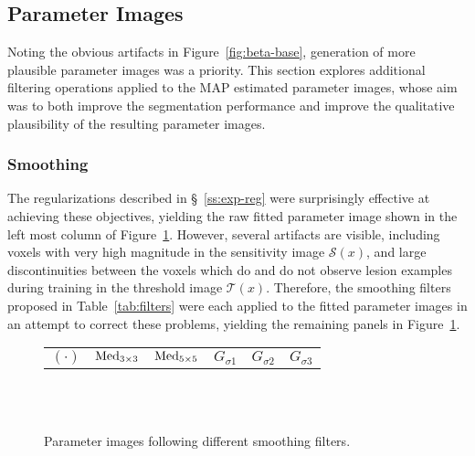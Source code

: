 \subsection{Parameter Images}\label{ss:exp-beta}
Noting the obvious artifacts in Figure~\ref{fig:beta-base},
generation of more plausible parameter images was a priority.
This section explores additional filtering operations applied to the
MAP estimated parameter images, whose aim was to both
improve the segmentation performance
and improve the qualitative plausibility of the resulting parameter images.
\subsubsection{Smoothing}\label{sss:exp-beta-smooth}
The regularizations described in \S~\ref{ss:exp-reg} were surprisingly effective
at achieving these objectives, yielding the raw fitted parameter image
shown in the left most column of Figure~\ref{fig:beta-smooth}.
However, several artifacts are visible, including
voxels with very high magnitude in the sensitivity image $\mathcal{S}(x)$,
and large discontinuities between the voxels which
do and do not observe lesion examples during training in the threshold image $\mathcal{T}(x)$.
Therefore, the smoothing filters proposed in Table~\ref{tab:filters}
were each applied to the fitted parameter images in an attempt to correct these problems,
yielding the remaining panels in Figure~\ref{fig:beta-smooth}.
\par
\begin{figure}
  \centering
  \begin{tabu} to 4.7 %
    $(\cdot)$ & $\mathrm{Med}_{3\times3}$ & $\mathrm{Med}_{5\times5}$ & $G_{\sigma1}$ & $G_{\sigma2}$ & $G_{\sigma3}$
  \end{tabu}%
  \\[0.5em]
  \\[0.5em]
  \caption{Parameter images following different smoothing filters.}%
  \label{fig:beta-smooth}
\end{figure}
